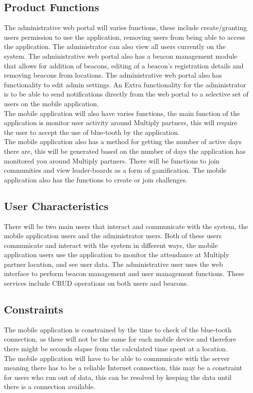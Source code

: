 \documentclass[11pt]{article}
\begin{document}
\subsection{Product Functions}
The administrative web portal will varies functions, these include create/granting users permission to use the application, removing users from being able to access the application. The administrator can also view all users currently on the system. The administrative web portal also has a beacon management module that allows for addition of beacons, editing of a beacon's registration details and removing beacons from locations.  The administrative web portal also has functionality to edit admin settings. An Extra functionality for the administrator is to be able to send notifications directly from the web portal to a selective set of users on the mobile application. \\
The mobile application will also have varies functions, the main function of the application is monitor user activity around Multiply partners, this will require the user to accept the use of blue-tooth by the application. \\  
The mobile application also has a method for getting the number of active days there are, this will be generated based on the number of days the application has monitored you around Multiply partners.  There will be functions to join communities and view leader-boards as a form of gamification. The mobile application also has the functions to create or join challenges.  
\subsection{User Characteristics}
There will be two main users that interact and communicate with the system, the mobile application users and the administrator users. Both of these users communicate and interact with the system in different ways, the mobile application users use the application to monitor the attendance at Multiply partner location, and see user data. The administrative user uses the web interface to perform beacon management and user management functions. These services include CRUD operations on both users and beacons.
   
\subsection{Constraints}
The mobile application is constrained by the time to check of the blue-tooth connection, as these will not be the same for each mobile device and therefore there might be seconds elapse from the calculated time spent at a location.\\
The mobile application will have to be able to communicate with the server meaning there has to be a reliable Internet connection, this may be a constraint for  users who run out of data, this can be resolved by keeping the data until there is a connection available.\\
\end{document}

